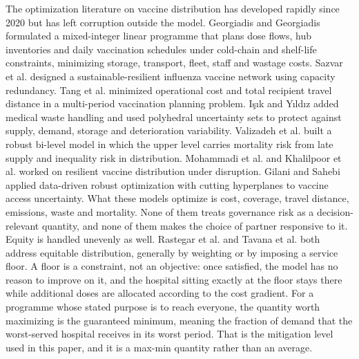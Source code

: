 \documentclass[a4paper]{elsarticle}
\begin{document}
{The optimization literature on vaccine distribution has developed rapidly since 2020 but has left corruption outside the model. Georgiadis and Georgiadis \cite{Georgiadis:2021} formulated a mixed-integer linear programme that plans dose flows, hub inventories and daily vaccination schedules under cold-chain and shelf-life constraints, minimizing storage, transport, fleet, staff and wastage costs. Sazvar et al. \cite{Sazvar:2021} designed a sustainable-resilient influenza vaccine network using capacity redundancy. Tang et al.  \cite{Tang:2022} minimized operational cost and total recipient travel distance in a multi-period vaccination planning problem. I\c{s}{\i}k and Y{\i}ld{\i}z \cite{Isik:2023} added medical waste handling and used polyhedral uncertainty sets to protect against supply, demand, storage and deterioration variability. Valizadeh et al. \cite{Valizadeh:2023} built a robust bi-level model in which the upper level carries mortality risk from late supply and inequality risk in distribution. Mohammadi et al. \cite{Mohammadi:2022} and Khalilpoor et al. \cite{Khalilpoor:2025} worked on resilient vaccine distribution under disruption. Gilani and Sahebi \cite{Gilani:2022} applied data-driven robust optimization with cutting hyperplanes to vaccine access uncertainty. What these models optimize is cost, coverage, travel distance, emissions, waste and mortality. None of them treats governance risk as a decision-relevant quantity, and none of them makes the choice of partner responsive to it.\\
Equity is handled unevenly as well. Rastegar et al. \cite{Rastegar:2021} and Tavana et al. \cite{Tavana:2021}  both address equitable distribution, generally by weighting or by imposing a service floor. A floor is a constraint, not an objective: once satisfied, the model has no reason to improve on it, and the hospital sitting exactly at the floor stays there while additional doses are allocated according to the cost gradient. For a programme whose stated purpose is to reach everyone, the quantity worth maximizing is the guaranteed minimum, meaning the fraction of demand that the worst-served hospital receives in its worst period. That is the mitigation level used in this paper, and it is a max-min quantity rather than an average.\\
}
\end{document}
